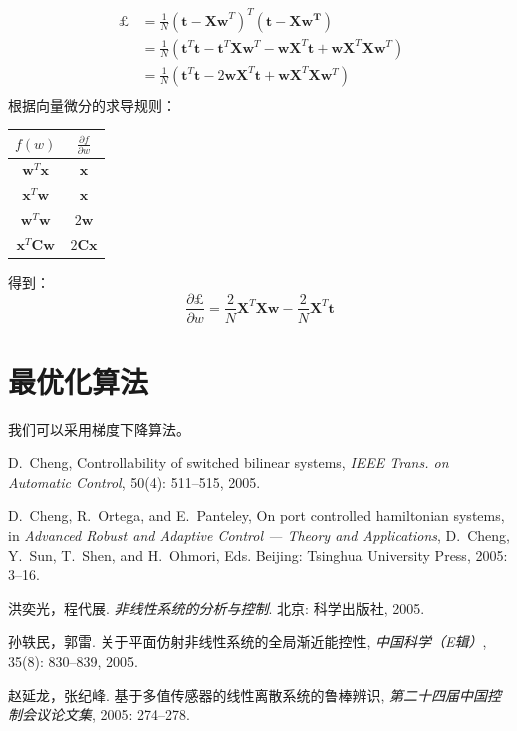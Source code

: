 \documentclass[a4paper, 11pt, UTF8]{ctexart} %
\begin{document}
\begin{align*}
\ \pounds &= \frac{1}{N}(\bm{t}-\bm{Xw}^T)^T(\bm{t}-\bm{Xw^T}) \\
          &= \frac{1}{N}(\bm{t}^T\bm{t} - \bm{t}^T\bm{X}\bm{w}^T - \bm{w}\bm{X}^T\bm{t}+\bm{w}\bm{X}^T\bm{X}\bm{w}^T) \\
          &= \frac{1}{N}(\bm{t}^T\bm{t} - 2\bm{w}\bm{X}^T\bm{t}+\bm{w}\bm{X}^T\bm{X}\bm{w}^T) \\
\end{align*}
根据向量微分的求导规则：
\begin{center}
\begin{tabular}{c|c}
\hline
$f(w)$                 & $\frac{\partial{f}}{\partial{w}}$   \\
\hline
$\bm{w}^T\bm{x}$       & $\bm{x}$                            \\
$\bm{x}^T\bm{w}$       & $\bm{x}$                            \\
$\bm{w}^T\bm{w}$       & $2\bm{w}$                           \\
$\bm{x}^T\bm{C}\bm{w}$ & $2\bm{Cx}$                          \\
\hline
\end{tabular}
\end{center}
得到：
$$ \frac{\partial{\pounds}}{\partial{w}} = \frac{2}{N}\bm{X}^T\bm{Xw}-\frac{2}{N}\bm{X}^T\bm{t} $$

\section{最优化算法}

我们可以采用梯度下降算法。


\begin{thebibliography}{0}

D.~Cheng, Controllability of switched bilinear systems, \emph{IEEE Trans. on
  Automatic Control}, 50(4): 511--515, 2005.

D.~Cheng, R.~Ortega, and E.~Panteley, On port controlled hamiltonian systems,
  in \emph{Advanced Robust and Adaptive Control --- Theory and Applications},
  D.~Cheng, Y.~Sun, T.~Shen, and H.~Ohmori, Eds. Beijing: Tsinghua University Press, 2005: 3--16.

洪奕光，程代展. \emph{非线性系统的分析与控制}. 北京: 科学出版社, 2005.

孙轶民，郭雷. 关于平面仿射非线性系统的全局渐近能控性, \emph{中国科学（E辑）},
  35(8): 830--839, 2005.

赵延龙，张纪峰. 基于多值传感器的线性离散系统的鲁棒辨识, \emph{第二十四届中国控制会议论文集}, 2005: 274--278.
\end{thebibliography}


\end{document}
